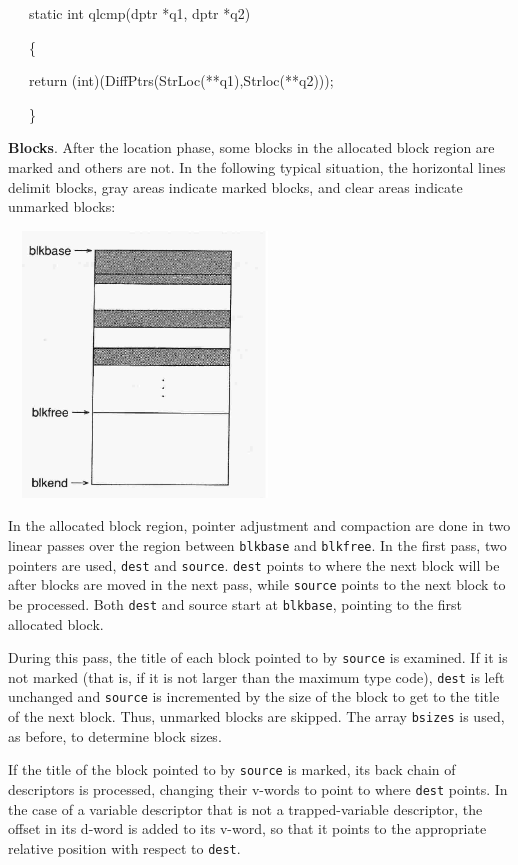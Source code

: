 \ \ \ static int qlcmp(dptr *q1, dptr *q2)

\ \ \ \{

\ \ \ return (int)(DiffPtrs(StrLoc(**q1),Strloc(**q2))); 

\ \ \ \}


\textbf{Blocks}. After the location phase, some blocks in the
allocated block region are marked and others are not. In the following
typical situation, the horizontal lines delimit blocks, gray areas
indicate marked blocks, and clear areas indicate unmarked blocks:


\ \  \includegraphics[width=2.5654in,height=2.7811in]{ib-img/ib-img102.jpg} 


In the allocated block region, pointer adjustment and compaction are
done in two linear passes over the region between \texttt{blkbase} and
\texttt{blkfree}. In the first pass, two pointers are used,
\texttt{dest} and \texttt{source}.  \texttt{dest} points to where the
next block will be after blocks are moved in the next pass, while
\texttt{source} points to the next block to be processed. Both
\texttt{dest} and source start at \texttt{blkbase}, pointing to the
first allocated block.

During this pass, the title of each block pointed to by
\texttt{source} is examined. If it is not marked (that is, if it is
not larger than the maximum type code), \texttt{dest} is left
unchanged and \texttt{source} is incremented by the size of the block
to get to the title of the next block. Thus, unmarked blocks are
skipped. The array \texttt{bsizes} is used, as before, to determine
block sizes.

If the title of the block pointed to by \texttt{source} is marked, its
back chain of descriptors is processed, changing their v-words to
point to where \texttt{dest} points. In the case of a variable
descriptor that is not a trapped-variable descriptor, the offset in
its d-word is added to its v-word, so that it points to the
appropriate relative position with respect to \texttt{dest}.

